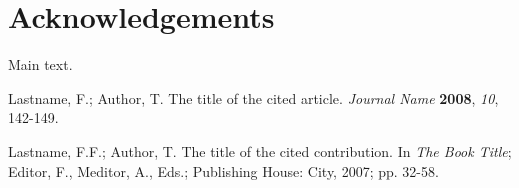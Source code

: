 \documentclass[genes,article,submit,moreauthors,pdftex,12pt,a4paper]{mdpi} %
\begin{document}
\section*{Acknowledgements}

Main text.


\makeatletter
\renewcommand\@biblabel[1]{#1. }
\makeatother
%

\begin{thebibliography}{1}
Lastname, F.; Author, T. The title of the cited article. {\em Journal Name} {\bf 2008}, {\em 10}, 142-149.


Lastname, F.F.; Author, T. The title of the cited contribution. In {\em The Book Title}; Editor, F., Meditor, A., Eds.; Publishing House: City, 2007; pp. 32-58.

\end{thebibliography}

\
\end{document}
